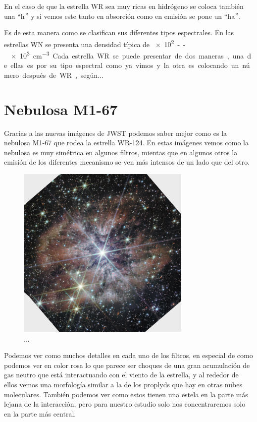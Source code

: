 \documentclass{book}
\begin{document}
En el caso de que la estrella WR sea muy ricas en hidrógeno se coloca también una ``h$"$ y si vemos este tanto en absorción como en emisión se pone un ``ha$"$.

Es de esta manera como se clasifican sus diferentes tipos espectrales. En las estrellas WN se presenta una densidad típica de \SI{e2}--\SI{e3}{cm^{-3}}. Cada estrella WR se puede presentar de dos maneras, una de ellas es por su tipo espectral como ya vimos y la otra es colocando un número después de WR, según...

\section{Nebulosa M1-67}

Gracias a las nuevas imágenes de JWST podemos saber mejor como es la nebulosa M1-67 que rodea la estrella WR-124. En estas imágenes vemos como la nebulosa es muy simétrica en algunos filtros, mientas que en algunos otros la emisión de los diferentes mecanismo se ven más intensos de un lado que del otro.

\begin{figure}[h]
    \centering
    \includegraphics[width=0.75\textwidth]{Chp1_m1-67-JWST.jpg}
    \caption{...}
    \label{fig:zones}
\end{figure}

Podemos ver como muchos detalles en cada uno de los filtros, en especial de como podemos ver en color rosa lo que parece ser choques de una gran acumulación de gas neutro que está interactuando con el viento de la estrella, y al rededor de ellos vemos una morfología similar a la de los proplyds que hay en otras nubes moleculares. También podemos ver como estos tienen una estela en la parte más lejana de la interacción, pero para nuestro estudio solo nos concentraremos solo en la parte más central.
\end{document}
